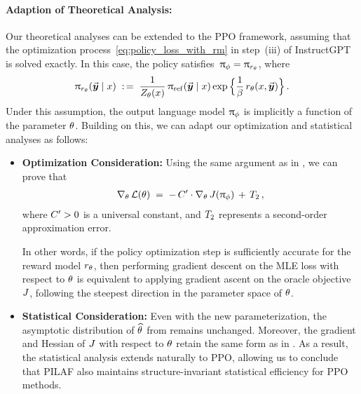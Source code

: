 \paragraph{Adaption of Theoretical Analysis:}
Our theoretical analyses can be extended to the PPO framework, assuming that the optimization process~\eqref{eq:policy_loss_with_rm} in step~(iii) of InstructGPT is solved exactly. In this case, the policy satisfies~\mbox{$\uppi_{\phi} = \uppi_{r_{\theta}}$}, where
\begin{align*}
	\uppi_{r_{\theta}}(\vec{\boldsymbol{y}}\!\, \mid x)
	\; :\,= \; \frac{1}{Z_{\theta}(x)} \, \uppi_{{\rm ref}}(\vec{\boldsymbol{y}}\!\, \mid x) \exp \Big\{ \frac{1}{\beta} \, r_{\theta}(x, \vec{\boldsymbol{y}}\!\,) \Big\} \, .
\end{align*}
Under this assumption, the output language model $\uppi_{\phi}$ is implicitly a function of the parameter $\theta$.
Building on this, we can adapt our optimization and statistical analyses as follows:

\begin{itemize}
    \item {\bf Optimization Consideration:}
    Using the same argument as in , we can prove that
    \begin{align*}
        \nabla_{\theta} \,  \mathcal{L}(\theta) \; = \;
    - \, C' \cdot \nabla_{\theta} \,  J(\uppi_{\phi}) \, + \, T_2 \, ,
    \end{align*}
    where $C' > 0$ is a universal constant, and $T_2$ represents a second-order approximation error.
    
    In other words, if the policy optimization step is sufficiently accurate for the reward model $r_{\theta}$, then performing gradient descent on the MLE loss with respect to $\theta$ is equivalent to applying gradient ascent on the oracle objective $J$, following the steepest direction in the parameter space of $\theta$.
    \item {\bf Statistical Consideration:}
    Even with the new parameterization, the asymptotic distribution of $\widehat{\theta}$ from  remains unchanged. Moreover, the gradient and Hessian of $J$ with respect to $\theta$ retain the same form as in . As a result, the statistical analysis extends naturally to PPO, allowing us to conclude that PILAF also maintains structure-invariant statistical efficiency for PPO methods.
\end{itemize}


